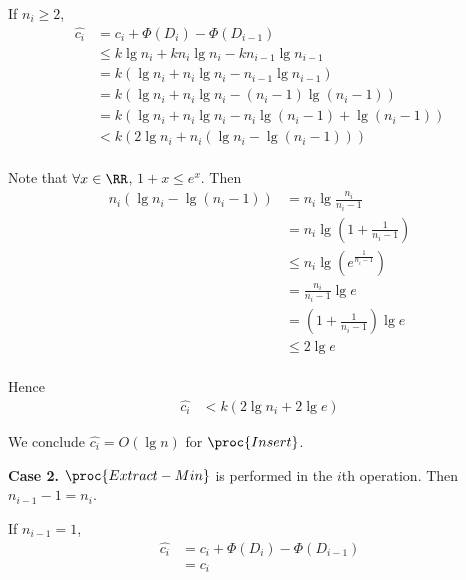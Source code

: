If $n_i \geq 2$,
\begin{equation*}
\begin{split}
    \hat{c_i} & = c_i + \Phi(D_i) - \Phi(D_{i - 1}) \\
    & \leq k \lg n_i + k n_i \lg n_i - k n_{i-1} \lg n_{i-1} \\
    & = k (\lg n_i + n_i \lg n_i - n_{i-1} \lg n_{i-1}) \\
    & = k (\lg n_i + n_i \lg n_i - (n_i - 1) \lg (n_i - 1)) \\
    & = k(\lg n_i + n_i \lg n_i - n_i \lg (n_i - 1) + \lg (n_i - 1)) \\
    & < k(2\lg n_i + n_i (\lg n_i - \lg (n_i - 1))) \\
\end{split}
\end{equation*}

Note that $\forall x \in \RR$, $1 + x \leq e^x$.
Then
\begin{equation*}
\begin{split}
    n_i (\lg n_i - \lg (n_i - 1)) & = n_i \lg \frac{n_i}{n_i - 1} \\
    & = n_i \lg (1 + \frac{1}{n_i - 1}) \\
    & \leq n_i \lg (e^{\frac{1}{n_i - 1}}) \\
    & = \frac{n_i}{n_i - 1} \lg e \\
    & = (1 + \frac{1}{n_i - 1}) \lg e \\
    & \leq 2 \lg e \\
\end{split}
\end{equation*}

Hence
\begin{equation*}
\begin{split}
    \hat{c_i} & < k(2\lg n_i + 2 \lg e)
\end{split}
\end{equation*}

We conclude $\hat{c_i} = O(\lg n)$ for $\proc{Insert}$.

\textbf{Case 2.}
$\proc{Extract-Min}$ is performed in the $i$th operation.
Then $n_{i-1} - 1 = n_i$.

If $n_{i-1} = 1$,
\begin{equation*}
\begin{split}
    \hat{c_i} & = c_i + \Phi(D_i) - \Phi(D_{i - 1}) \\
    & = c_i \\
\end{split}
\end{equation*}

